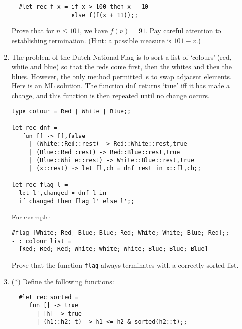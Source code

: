 \begin{enumerate}
\begin{boxed}\begin{verbatim}
  #let rec f x = if x > 100 then x - 10
                 else f(f(x + 11));;
\end{verbatim}\end{boxed}

Prove that for $n \leq 101$, we have $f(n) = 91$. Pay careful attention to
establishing termination. (Hint: a possible measure is $101 - x$.)

\item The problem of the Dutch National Flag is to sort a list of `colours'
(red, white and blue) so that the reds come first, then the whites and then the
blues. However, the only method permitted is to swap adjacent elements. Here is
an ML solution. The function {\tt dnf} returns `true' iff it has made a change,
and this function is then repeated until no change occurs.

\begin{boxed}\begin{lstlisting}
type colour = Red | White | Blue;;

let rec dnf =
   fun [] -> [],false
     | (White::Red::rest) -> Red::White::rest,true
     | (Blue::Red::rest) -> Red::Blue::rest,true
     | (Blue::White::rest) -> White::Blue::rest,true
     | (x::rest) -> let fl,ch = dnf rest in x::fl,ch;;

let rec flag l =
  let l',changed = dnf l in
  if changed then flag l' else l';;
\end{lstlisting}\end{boxed}

\noindent For example:

\begin{boxed}\begin{verbatim}
#flag [White; Red; Blue; Blue; Red; White; White; Blue; Red];;
- : colour list =
  [Red; Red; Red; White; White; White; Blue; Blue; Blue]
\end{verbatim}\end{boxed}

Prove that the function {\tt flag} always terminates with a correctly sorted
list.

\item (*) Define the following functions:

\begin{boxed}\begin{verbatim}
  #let rec sorted =
     fun [] -> true
       | [h] -> true
       | (h1::h2::t) -> h1 <= h2 & sorted(h2::t);;


\end{verbatim}
\end{boxed}
\end{enumerate}
